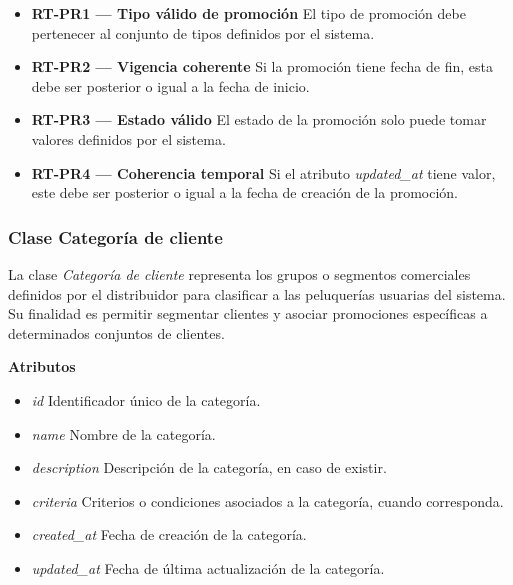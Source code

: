 \begin{itemize}

      \item \textbf{RT-PR1 — Tipo válido de promoción}
            El tipo de promoción debe pertenecer al conjunto de tipos definidos por el sistema.
      \item \textbf{RT-PR2 — Vigencia coherente}
            Si la promoción tiene fecha de fin, esta debe ser posterior o igual a la fecha de inicio.
      \item \textbf{RT-PR3 — Estado válido}
            El estado de la promoción solo puede tomar valores definidos por el sistema.
      \item \textbf{RT-PR4 — Coherencia temporal}
            Si el atributo \textit{updated\_at} tiene valor, este debe ser posterior o igual a la fecha de creación de la promoción.

\end{itemize}

\subsubsection{Clase Categoría de cliente}

La clase \textit{Categoría de cliente} representa los grupos o segmentos comerciales definidos por el distribuidor para clasificar a las peluquerías usuarias del sistema. Su finalidad es permitir segmentar clientes y asociar promociones específicas a determinados conjuntos de clientes.

\textbf{Atributos}

\begin{itemize}

      \item \textit{id}
            Identificador único de la categoría.
      \item \textit{name}
            Nombre de la categoría.
      \item \textit{description}
            Descripción de la categoría, en caso de existir.
      \item \textit{criteria}
            Criterios o condiciones asociados a la categoría, cuando corresponda.
      \item \textit{created\_at}
            Fecha de creación de la categoría.
      \item \textit{updated\_at}
            Fecha de última actualización de la categoría.

\end{itemize}

